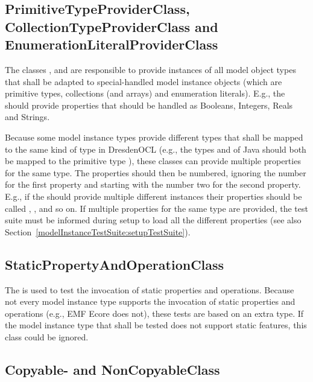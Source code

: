 \subsection{PrimitiveTypeProviderClass, CollectionTypeProviderClass and 
E\-nu\-me\-ra\-tion\-Li\-te\-ral\-ProviderClass}
\label{modelInstanceTestSuite:specialTypeProviderClasses}

The classes , 
 and 
 are responsible to provide 
instances of all model object types that shall be adapted to special-handled 
model instance objects (which are primitive types, collections (and arrays) and
enumeration literals). E.g., the  should 
provide properties that should be handled as Booleans, Integers, Reals and 
Strings.

Because some model instance types provide different types that shall be mapped
to the same kind of type in DresdenOCL (e.g., the types  and
 of Java should both be mapped to the primitive type 
), these classes can provide multiple properties for the same 
type. The properties should then be numbered, ignoring the number for the first 
property and starting with the number two for the second property. E.g., if the 
 should provide multiple 
different  instances their properties should be called 
, ,  and so 
on. If multiple properties for the same type are provided, the test suite must 
be informed during setup to load all the different properties (see also 
Section~\ref{modelInstanceTestSuite:setupTestSuite}).


\subsection{StaticPropertyAndOperationClass}

The  is used to test the invocation of 
static properties and operations. Because not every model instance type supports
the invocation of static properties and operations (e.g., \acs{EMF} Ecore does 
not), these tests are based on an extra type. If the model instance type that
shall be tested does not support static features, this class could be ignored.


\subsection{Copyable- and NonCopyableClass}

